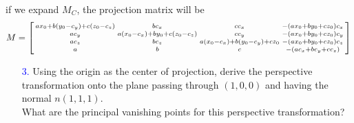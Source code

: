 \documentclass[11pt]{article}  %
\begin{document}
    if we expand $M_C$, the projection matrix will be\vspace{1mm}
    \begin{align*}
        M=
        \begin{bsmallmatrix}
            ax_0+b(y_0-c_y)+c(z_0-c_z) & bc_x                       & cc_x                       & -(ax_0+by_0+cz_0)c_x\\
            ac_y                       & a(x_0-c_x)+by_0+c(z_0-c_z) & cc_y                       & -(ax_0+by_0+cz_0)c_y\\
            ac_z                       & bc_z                       & a(x_0-c_x)+b(y_0-c_y)+cz_0 & -(ax_0+by_0+cz_0)c_z\\
            a                          & b                          & c                          & -(ac_x+bc_y+cc_z)
        \end{bsmallmatrix}
    \end{align*}\vspace{2mm}

    \begin{enumerate}[leftmargin=*]
        \item[\textcolor{blue}{3.}] Using the origin as the center of projection, derive the perspective transformation onto the plane passing through $(1,0,0)$ and having the normal $n(1,1,1)$.\\
        What are the principal vanishing points for this perspective transformation?
    \end{enumerate}
    
    \solution
    
\end{document}
